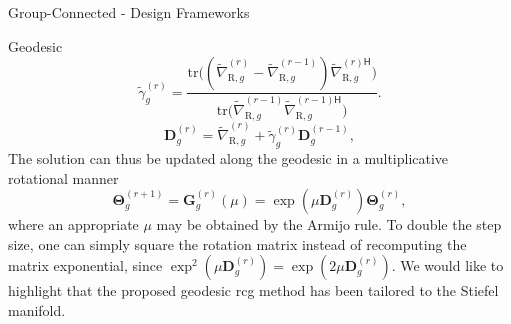 \documentclass[journal]{IEEEtran}
\begin{document}
\begin{section}{Group-Connected - Design Frameworks}
\begin{subsection}{Geodesic }
		\begin{equation}
			\tilde{\gamma}_g^{(r)} = \frac{\mathrm{tr}\bigl((\tilde{\nabla}_{\mathrm{R},g}^{(r)} - \tilde{\nabla}_{\mathrm{R},g}^{(r-1)}) {\tilde{\nabla}_{\mathrm{R},g}^{(r)\mathsf{H}}}\bigr)}{\mathrm{tr}\bigl(\tilde{\nabla}_{\mathrm{R},g}^{(r-1)} {\tilde{\nabla}_{\mathrm{R},g}^{(r-1)\mathsf{H}}}\bigr)}. %
			\label{eq:parameter_cg_geodesic}
		\end{equation}
		\begin{equation}
			{\mathbf{D}}_g^{(r)} = \tilde{\nabla}_{\mathrm{R},g}^{(r)} + \tilde{\gamma}_g^{(r)} {\mathbf{D}}_g^{(r-1)},
			\label{eq:direction_cg_geodesic}
		\end{equation}
		The solution can thus be updated along the geodesic in a multiplicative rotational manner
		\begin{equation}
			\mathbf{\Theta}_g^{(r+1)} = \mathbf{G}_g^{(r)}(\mu) = \exp(\mu \mathbf{D}_g^{(r)}) \mathbf{\Theta}_g^{(r)},
			\label{eq:update_geodesic}
		\end{equation}
		where an appropriate $\mu$ may be obtained by the Armijo rule.
		To double the step size, one can simply square the rotation matrix instead of recomputing the matrix exponential, since $\exp^2(\mu \mathbf{D}_g^{(r)}) = \exp(2 \mu \mathbf{D}_g^{(r)})$.
		We would like to highlight that the proposed geodesic \gls{rcg} method has been tailored to the Stiefel manifold.


\end{subsection}
\end{section}
\end{document}
